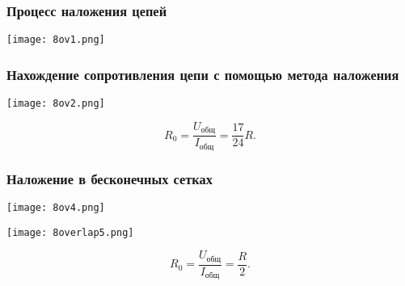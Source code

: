 \documentclass[12pt, a4paper]{article}
\begin{document}
\subsubsection*{Процесс наложения цепей}

\begin{center}
\texttt{[image: 8ov1.png]}
\end{center}

\subsubsection*{Нахождение сопротивления цепи с помощью метода наложения}

\begin{center}
\texttt{[image: 8ov2.png]}
\end{center}

\[
R_0 = \frac{U_\text{общ}}{I_\text{общ}} = \frac{17}{24}R.
\]

\subsubsection*{Наложение в бесконечных сетках}

\begin{center}
\texttt{[image: 8ov4.png]}
\end{center}

\begin{center}
\texttt{[image: 8overlap5.png]}
\end{center}

\[
R_0 = \frac{U_\text{общ}}{I_\text{общ}} = \frac{R}{2}.
\]
\end{document}
